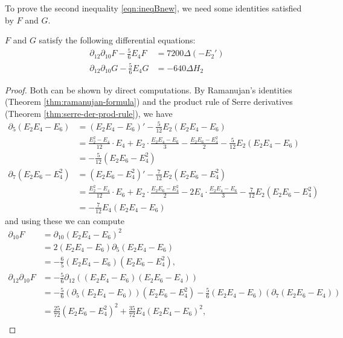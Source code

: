 To prove the second inequality \eqref{eqn:ineqBnew}, we need some identities satisfied by $F$ and $G$.
\begin{lemma}\label{lemma:F-G-de}
$F$ and $G$ satisfy the following differential equations:
\begin{align}
    \partial_{12}\partial_{10} F - \frac{5}{6} E_{4} F &= 7200 \Delta (-E_{2}') \label{eqn:ddf} \\
    \partial_{12}\partial_{10} G - \frac{5}{6} E_{4} G &= -640 \Delta H_{2} \label{eqn:ddg}
\end{align}
\end{lemma}
\begin{proof}
Both can be shown by direct computations.
By Ramanujan's identities (Theorem \ref{thm:ramanujan-formula}) and the product rule of Serre derivatives (Theorem \ref{thm:serre-der-prod-rule}), we have
\begin{align}
    \partial_{5} (E_2 E_4 - E_6) &= (E_2 E_4 - E_6)' - \frac{5}{12} E_2 (E_2 E_4 - E_6) \\
    &= \frac{E_2^2 - E_4}{12} \cdot E_4 + E_2 \cdot \frac{E_2 E_4 - E_6}{3} - \frac{E_2 E_6 - E_4^2}{2} - \frac{5}{12}E_2 (E_2 E_4 - E_6) \\
    &= -\frac{5}{12} (E_2 E_6 - E_4^2) \label{eqn:S5} \\
    \partial_{7} (E_2 E_6 - E_4^2) &= (E_2 E_6 - E_4^2)' - \frac{7}{12} E_2 (E_2 E_6 - E_4^2) \\
    &= \frac{E_2^2 - E_4}{12} \cdot E_6 + E_2 \cdot \frac{E_2 E_6 - E_4^2}{2} - 2 E_4 \cdot \frac{E_2 E_4 - E_6}{3} - \frac{7}{12} E_2 (E_2 E_6 - E_4^2) \\
    &= -\frac{7}{12} E_4 (E_2 E_4 - E_6) \label{eqn:S7}
\end{align}
and using these we can compute
\begin{align}
    \partial_{10} F &= \partial_{10} (E_2 E_4 - E_6)^2 \\
    &= 2 (E_2 E_4 - E_6) \partial_{5} (E_2 E_4 - E_6) \\
    &= -\frac{6}{5} (E_2 E_4 - E_6) (E_2 E_6 - E_4^2), \\
    \partial_{12}\partial_{10} F &= -\frac{5}{6} \partial_{12} ((E_2 E_4 - E_6) (E_2 E_6 - E_4)) \\
    &= -\frac{5}{6} (\partial_{5}(E_2 E_4 - E_6)) (E_2 E_6 - E_4^2) - \frac{5}{6} (E_2 E_4 - E_6) (\partial_{7} (E_2 E_6 - E_4)) \\
    &= \frac{25}{72} (E_2 E_6 - E_4^2)^2 + \frac{35}{72} E_4 (E_2 E_4 - E_6)^2, \\

\end{align}
\end{proof}
